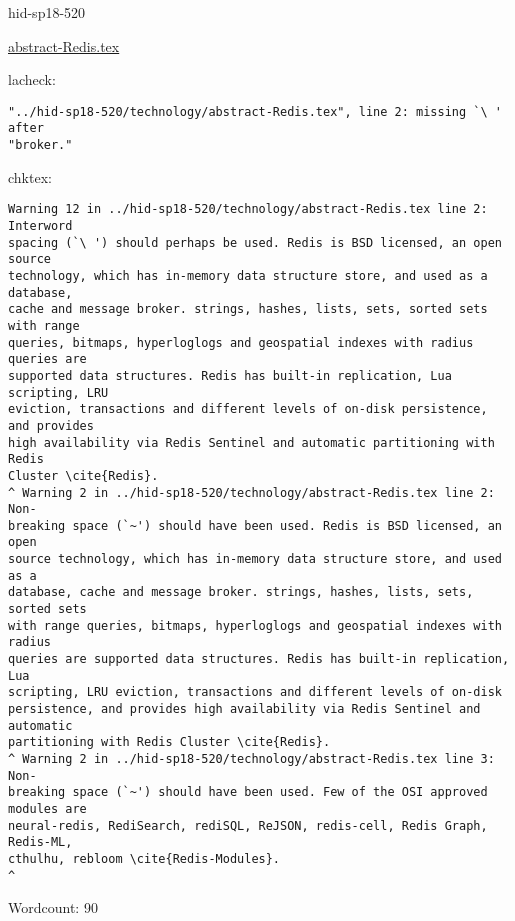 \begin{IU}

hid-sp18-520

\href{https://github.com/cloudmesh-community/hid-sp18-520/blob/master//technology/abstract-Redis.tex}{abstract-Redis.tex}

 
lacheck:
\begin{tiny}
\begin{verbatim}
"../hid-sp18-520/technology/abstract-Redis.tex", line 2: missing `\ ' after
"broker."
\end{verbatim}
\end{tiny}
chktex:
\begin{tiny}
\begin{verbatim}
Warning 12 in ../hid-sp18-520/technology/abstract-Redis.tex line 2: Interword
spacing (`\ ') should perhaps be used. Redis is BSD licensed, an open source
technology, which has in-memory data structure store, and used as a database,
cache and message broker. strings, hashes, lists, sets, sorted sets with range
queries, bitmaps, hyperloglogs and geospatial indexes with radius queries are
supported data structures. Redis has built-in replication, Lua scripting, LRU
eviction, transactions and different levels of on-disk persistence, and provides
high availability via Redis Sentinel and automatic partitioning with Redis
Cluster \cite{Redis}.
^ Warning 2 in ../hid-sp18-520/technology/abstract-Redis.tex line 2: Non-
breaking space (`~') should have been used. Redis is BSD licensed, an open
source technology, which has in-memory data structure store, and used as a
database, cache and message broker. strings, hashes, lists, sets, sorted sets
with range queries, bitmaps, hyperloglogs and geospatial indexes with radius
queries are supported data structures. Redis has built-in replication, Lua
scripting, LRU eviction, transactions and different levels of on-disk
persistence, and provides high availability via Redis Sentinel and automatic
partitioning with Redis Cluster \cite{Redis}.
^ Warning 2 in ../hid-sp18-520/technology/abstract-Redis.tex line 3: Non-
breaking space (`~') should have been used. Few of the OSI approved modules are
neural-redis, RediSearch, rediSQL, ReJSON, redis-cell, Redis Graph, Redis-ML,
cthulhu, rebloom \cite{Redis-Modules}.
^
\end{verbatim}
\end{tiny}

Wordcount: 90

\end{IU}



